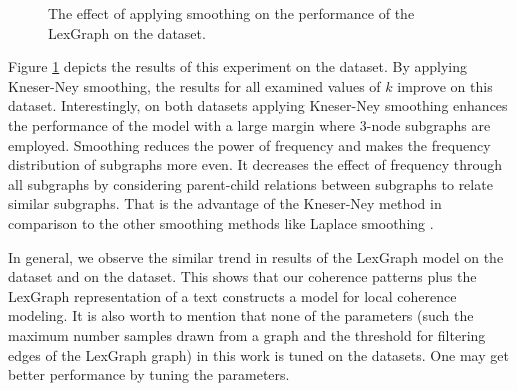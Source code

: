 \begin{figure}[!ht]
  \begin{center}
      \mydata
  \end{center}
  \caption{The effect of applying smoothing on the performance of the LexGraph on the \declercqds dataset.} 
  \label{fig:declercq-smoothing}
\end{figure}


Figure \ref{fig:declercq-smoothing} depicts the results of this experiment on the \declercqds dataset. 
By applying Kneser-Ney smoothing, the results for all examined values of $k$ improve on this dataset.  
Interestingly, on both datasets applying Kneser-Ney smoothing enhances the performance of the model with a large margin where 3-node subgraphs are employed. 
Smoothing reduces the power of frequency and makes the frequency distribution of subgraphs more even. 
It decreases the effect of frequency through all subgraphs by considering parent-child relations between subgraphs to relate similar subgraphs. 
That is the advantage of the \mbox{Kneser-Ney} method in comparison to the other smoothing methods like Laplace smoothing \cite{jurafsky08}. 

In general, we observe the similar trend in results of the LexGraph model on the \declercqds dataset and on the \pitlerds dataset. 
This shows that our coherence patterns plus the LexGraph representation of a text constructs a model for local coherence modeling. 
It is also worth to mention that none of the parameters (such the maximum number samples drawn from a graph and the threshold for filtering edges of the LexGraph graph) in this work is tuned on the datasets. 
One may get better performance by tuning the parameters.

